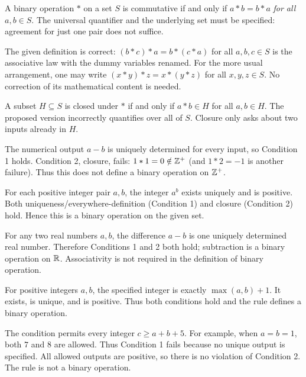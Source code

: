 A binary operation $*$ on a set $S$ is commutative if and only if $a*b=b*a$ \emph{for all} $a,b\in S$. The universal quantifier and the underlying set must be specified: agreement for just one pair does not suffice.


The given definition is correct: $(b*c)*a=b*(c*a)$ for all $a,b,c\in S$ is the associative law with the dummy variables renamed. For the more usual arrangement, one may write $(x*y)*z=x*(y*z)$ for all $x,y,z\in S$. No correction of its mathematical content is needed.


A subset $H\subseteq S$ is closed under $*$ if and only if $a*b\in H$ for all $a,b\in H$. The proposed version incorrectly quantifies over all of $S$. Closure only asks about two inputs already in $H$.


The numerical output $a-b$ is uniquely determined for every input, so Condition 1 holds. Condition 2, closure, fails: $1*1=0\notin\mathbb{Z}^+$ (and $1*2=-1$ is another failure). Thus this does not define a binary operation on $\mathbb{Z}^+$.


For each positive integer pair $a,b$, the integer $a^b$ exists uniquely and is positive. Both uniqueness/everywhere-definition (Condition 1) and closure (Condition 2) hold. Hence this is a binary operation on the given set.


For any two real numbers $a,b$, the difference $a-b$ is one uniquely determined real number. Therefore Conditions 1 and 2 both hold; subtraction is a binary operation on $\mathbb{R}$. Associativity is not required in the definition of binary operation.


For positive integers $a,b$, the specified integer is exactly $\max(a,b)+1$. It exists, is unique, and is positive. Thus both conditions hold and the rule defines a binary operation.


The condition permits every integer $c\ge a+b+5$. For example, when $a=b=1$, both $7$ and $8$ are allowed. Thus Condition 1 fails because no unique output is specified. All allowed outputs are positive, so there is no violation of Condition 2. The rule is not a binary operation.


